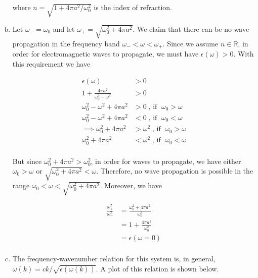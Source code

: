 \documentclass[]{article}
\begin{document}
\begin{enumerate}[a)]
where $n = \sqrt{ 1 + 4 \pi a^2 / \omega_0^2 }$ is the index of refraction. \\

\item Let $\omega_- = \omega_0$ and let $\omega_+ = \sqrt{ \omega_0^2 + 4\pi a^2}$. We claim that there can be no wave propagation in the frequency band $\omega_- < \omega < \omega_+$. Since we assume $n\in\mathbb{R}$, in order for electromagnetic waves to propagate, we must have $\epsilon(\omega) >0$. With this requirement we have

\begin{equation}
\begin{split}
\epsilon(\omega) & > 0 \\
1 + \frac{4 \pi a^2}{ \omega_0^2 - \omega^2} & > 0 \\
\omega_0^2 - \omega^2 + 4\pi a^2 &  > 0 \; \text{, if } \; \omega_0 > \omega \\
\omega_0^2 - \omega^2 + 4\pi a^2 &  < 0 \; \text{, if } \; \omega_0 < \omega \\
\implies 
\omega_0^2  + 4\pi a^2 &  > \omega^2 \; \text{, if } \; \omega_0 > \omega \\
\omega_0^2  + 4\pi a^2 &  < \omega^2 \; \text{, if } \; \omega_0 < \omega \\
\end{split}
\end{equation}

But since $\omega_0^2  + 4\pi a^2 > \omega_0^2$, in order for waves to propagate, we have either  $\omega_0 > \omega$ or $ \sqrt{ \omega_0^2  + 4\pi a^2 } < \omega$. Therefore, no wave propagation is possible in the range $\omega_0 < \omega < \sqrt{ \omega_0^2 + 4\pi a^2}$. Moreover, we have

\begin{equation}
\begin{split}
\frac{ \omega_+^2 }{ \omega_-^2  } & =  \frac{  \omega_0^2 + 4\pi a^2  }{ \omega_0^2} \\
& = 1 + \frac{ 4\pi a^2 }{\omega_0^2} \\
& = \epsilon(\omega = 0) \\
\end{split}
\end{equation}

\item

The frequency-wavenumber relation for this system is, in general, $\omega( k) = ck/ \sqrt{\epsilon(\omega(k))}$. A plot of this relation is shown below.


\end{enumerate}
\end{document}
